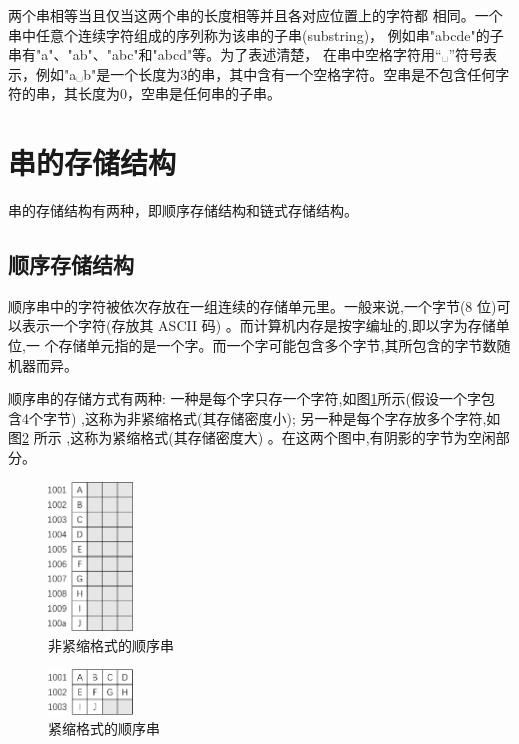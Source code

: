 \documentclass[lang=cn,newtx,10pt,scheme=chinese]{../elegantbook}
\begin{document}
两个串相等当且仅当这两个串的长度相等并且各对应位置上的字符都
相同。一个串中任意个连续字符组成的序列称为该串的子串(substring)，
例如串"abcde"的子串有"a"、"ab"、"abc"和"abcd"等。为了表述清楚，
在串中空格字符用“␣”符号表示，例如"a␣b"是一个长度为3的串，其中含有一个空格字符。空串是不包含任何字符的串，其长度为0，空串是任何串的子串。


\section{串的存储结构}

串的存储结构有两种，即顺序存储结构和链式存储结构。
\subsection{顺序存储结构}


顺序串中的字符被依次存放在一组连续的存储单元里。一般来说,一个字节(8 位)可
以表示一个字符(存放其 ASCII 码) 。而计算机内存是按字编址的,即以字为存储单位,一
个存储单元指的是一个字。而一个字可能包含多个字节,其所包含的字节数随机器而异。

顺序串的存储方式有两种: 一种是每个字只存一个字符,如图\ref{fig:seqString}所示(假设一个字包
含4个字节) ,这称为非紧缩格式(其存储密度小); 另一种是每个字存放多个字符,如图\ref{fig:tightSeqString}
所示 ,这称为紧缩格式(其存储密度大) 。在这两个图中,有阴影的字节为空闲部分。



\begin{figure}[!htbp]
  \centering
  \includegraphics[width=0.2\textwidth]{./figure/pdf/cropped/narrowString.pdf}
  \caption{非紧缩格式的顺序串}
  \label{fig:seqString}
\end{figure}


\begin{figure}[!htbp]
  \centering
  \includegraphics[width=0.2\textwidth]{./figure/pdf/cropped/notNarrowString.pdf}
  \caption{紧缩格式的顺序串}
  \label{fig:tightSeqString}
\end{figure}
\end{document}
